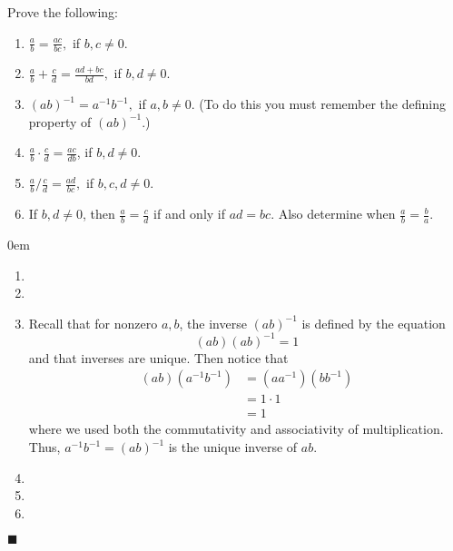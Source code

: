 \documentclass[12pt]{article}
\renewcommand{\qed}{\hfill$\blacksquare$}
\renewenvironment{proof}{\begin{addmargin}[1em]{0em}\begin{newproof}}{\end{newproof}\end{addmargin}\qed}
\newenvironment{problem}[2][Problem]{\begin{trivlist}
\item[\hskip \labelsep {\bfseries #1}\hskip \labelsep {\bfseries #2.}]}{\end{trivlist}}
\begin{document}
\begin{problem}{1.3}
Prove the following:
\begin{enumerate}[label=(\roman*)]
	\item $\frac{a}{b} = \frac{ac}{bc},$ if $b,c \neq 0$.
	\item $\frac{a}{b} + \frac{c}{d} = \frac{ad+bc}{bd},$ if $b,d\neq 0$.
	\item $\left(ab\right)^{-1} = a^{-1}b^{-1},$ if $a,b\neq 0$. (To do this you must remember the defining property of $\left(ab\right)^{-1}$.)
	\item $\frac{a}{b}\cdot \frac{c}{d} = \frac{ac}{db}$, if $b,d\neq 0$.
	\item $\frac{a}{b} / \frac{c}{d} = \frac{ad}{bc},$ if $b,c,d\neq 0$.
	\item If $b,d\neq 0$, then $\frac{a}{b} = \frac{c}{d}$ if and only if $ad=bc$. Also determine when $\frac{a}{b}=\frac{b}{a}$.
\end{enumerate}
\end{problem}
\begin{proof}
\begin{enumerate}[label=(\roman*)]
	\item
	\item
	\item Recall that for nonzero $a,b$, the inverse $\left(ab\right)^{-1}$ is defined by the equation \[ \left(ab\right)\left(ab\right)^{-1} = 1 \] and that inverses are unique. Then notice that \[ \begin{split} \left(ab\right) \left(a^{-1}b^{-1}\right) & = \left(aa^{-1}\right)\left(bb^{-1}\right) \\ & = 1\cdot 1 \\ & = 1 \end{split} \] where we used both the commutativity and associativity of multiplication. Thus, $a^{-1}b^{-1} = \left(ab\right)^{-1}$ is the unique inverse of $ab$.
	\item
	\item
	\item
\end{enumerate}
\end{proof}
\end{document}
